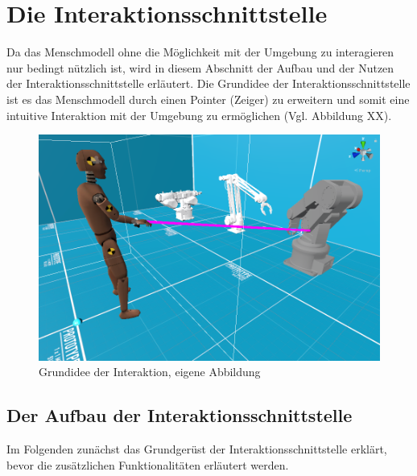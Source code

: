 \section{Die Interaktionsschnittstelle}\label{sec:DieInteraktionsschnittstelle}
Da das Menschmodell ohne die Möglichkeit mit der Umgebung zu interagieren nur bedingt nützlich ist, wird in diesem Abschnitt der Aufbau und der Nutzen der Interaktionsschnittstelle erläutert. Die Grundidee der Interaktionsschnittstelle ist es das Menschmodell durch einen Pointer (Zeiger) zu erweitern und somit eine intuitive Interaktion mit der Umgebung zu ermöglichen (Vgl. Abbildung XX).
\begin{figure}[h]
	\centering
	\includegraphics[width=0.65\linewidth]{Bilder/A44_InteraktionsBeispiel}
	\caption{Grundidee der Interaktion, eigene Abbildung}
	\label{fig:InteraktionBeispiel}
\end{figure}

\subsection{Der Aufbau der Interaktionsschnittstelle}\label{sec:AufbauInteraktion}
Im Folgenden zunächst das Grundgerüst der Interaktionsschnittstelle erklärt, bevor die zusätzlichen Funktionalitäten erläutert werden.

